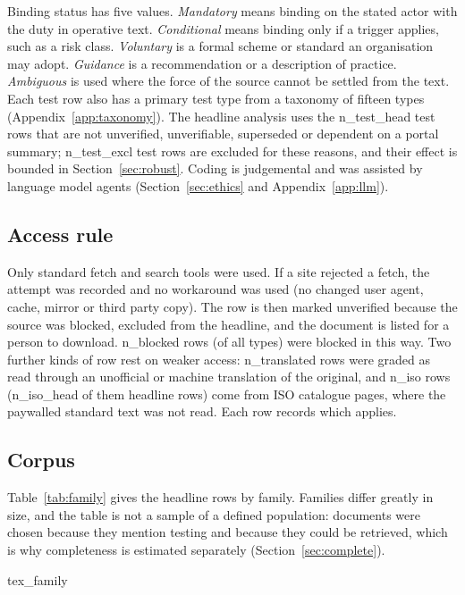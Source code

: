 \documentclass[conference]{IEEEtran}
\begin{document}
Binding status has five values. \emph{Mandatory} means binding on the stated actor with the duty in operative text. \emph{Conditional} means binding only if a trigger applies, such as a risk class. \emph{Voluntary} is a formal scheme or standard an organisation may adopt. \emph{Guidance} is a recommendation or a description of practice. \emph{Ambiguous} is used where the force of the source cannot be settled from the text. Each test row also has a primary test type from a taxonomy of fifteen types (Appendix~\ref{app:taxonomy}). The headline analysis uses the {{n_test_head}} test rows that are not unverified, unverifiable, superseded or dependent on a portal summary; {{n_test_excl}} test rows are excluded for these reasons, and their effect is bounded in Section~\ref{sec:robust}. Coding is judgemental and was assisted by language model agents (Section~\ref{sec:ethics} and Appendix~\ref{app:llm}).

\subsection{Access rule}
Only standard fetch and search tools were used. If a site rejected a fetch, the attempt was recorded and no workaround was used (no changed user agent, cache, mirror or third party copy). The row is then marked unverified because the source was blocked, excluded from the headline, and the document is listed for a person to download. {{n_blocked}} rows (of all types) were blocked in this way. Two further kinds of row rest on weaker access: {{n_translated}} rows were graded as read through an unofficial or machine translation of the original, and {{n_iso}} rows ({{n_iso_head}} of them headline rows) come from ISO catalogue pages, where the paywalled standard text was not read. Each row records which applies.

\subsection{Corpus}
Table~\ref{tab:family} gives the headline rows by family. Families differ greatly in size, and the table is not a sample of a defined population: documents were chosen because they mention testing and because they could be retrieved, which is why completeness is estimated separately (Section~\ref{sec:complete}).

\begin{table}[t]\centering\small
{{tex_family}}
\caption{Headline test provisions by family: number of documents with headline rows, rows by binding status, and the binding (mandatory or conditional) share with a 95\% Wilson interval over rows. Intervals ignore clustering by document and are narrow for that reason.}\label{tab:family}
\end{table}
\end{document}
